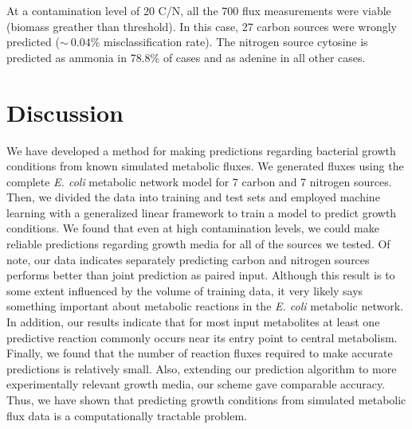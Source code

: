 \documentclass[12pt]{article}
\begin{document}
At a contamination level of 20 C/N, all the 700 flux measurements were viable (biomass greather than threshold). In this case, 27 carbon sources were wrongly predicted ($\sim~0.04\%$ misclassification rate). The nitrogen source cytosine is predicted as ammonia in 78.8\% of cases and as adenine in all other cases.

\section*{Discussion}

We have developed a method for making predictions regarding bacterial growth conditions from known simulated metabolic fluxes. We generated fluxes using the complete \emph{E. coli} metabolic network model for 7 carbon and 7 nitrogen sources. Then, we divided the data into training and test sets and employed machine learning with a generalized linear framework to train a model to predict growth conditions. We found that even at high contamination levels, we could make reliable predictions regarding growth media for all of the sources we tested. Of note, our data indicates separately predicting carbon and nitrogen sources performs better than joint prediction as paired input. Although this result is to some extent influenced by the volume of training data, it very likely says something important about metabolic reactions in the \emph{E. coli} metabolic network. In addition, our results indicate that for most input metabolites at least one predictive reaction commonly occurs near its entry point to central metabolism. Finally, we found that the number of reaction fluxes required to make accurate predictions is relatively small. Also, extending our prediction algorithm to more experimentally relevant growth media, our scheme gave comparable accuracy. Thus, we have shown that predicting growth conditions from simulated metabolic flux data is a computationally tractable problem.
\end{document}
